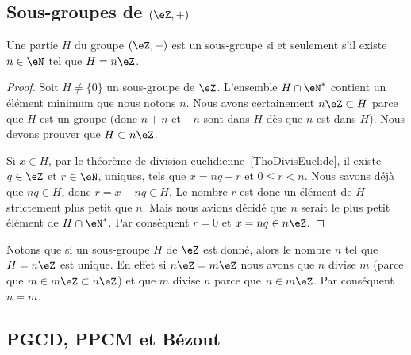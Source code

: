 
\subsection{Sous-groupes de \texorpdfstring{$(\eZ,+)$}{(Z,+)}}

\begin{proposition} \label{PropSsgpZestnZ}
    Une partie \( H\) du groupe \( (\eZ,+)\) est un sous-groupe si et seulement s'il existe \( n\in\eN\) tel que \( H=n\eZ\).
\end{proposition}

\begin{proof}
    Soit \( H\neq\{ 0 \}\) un sous-groupe de \( \eZ\). L'ensemble \( H\cap\eN^*\) contient un élément minimum que nous notons \( n\). Nous avons certainement \( n\eZ\subset H\) parce que \( H\) est un groupe (donc \( n+n\) et \( -n\) sont dans \( H\) dès que \( n\) est dans \( H\)). Nous devons prouver que \( H\subset n\eZ\).

    Si \( x\in H\), par le théorème de division euclidienne~\ref{ThoDivisEuclide}, il existe \( q\in\eZ\) et \( r\in\eN \), uniques, tels que \( x=nq+r\) et \(0 \leq r < n \). Nous savons déjà que \( nq\in H\), donc \( r = x - nq \in H \). Le nombre \( r\) est donc un élément de \( H\) strictement plus petit que \( n\). Mais nous avions décidé que \( n\) serait le plus petit élément de \( H\cap\eN^*\). Par conséquent \( r=0\) et \( x=nq\in n\eZ\).
\end{proof}


Notons que si un sous-groupe \( H\) de \( \eZ\) est donné, alors le nombre \( n\) tel que \( H=n\eZ\) est unique. En effet si \( n\eZ=m\eZ\) nous avons que \( n\) divise \( m\) (parce que \( m\in m\eZ\subset n\eZ\)) et que \( m\) divise \( n\) parce que \( n\in m\eZ\). Par conséquent \( n=m\).


\subsection{PGCD, PPCM et Bézout}

